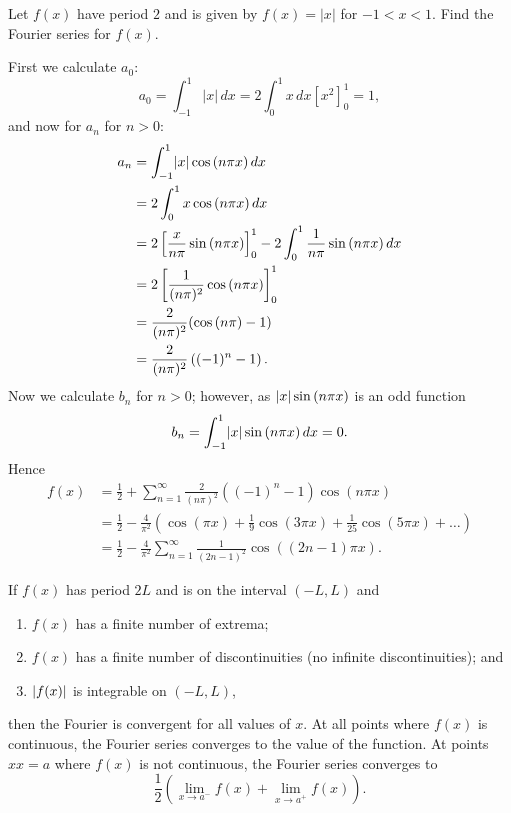 \begin{example}
    Let \(f(x)\) have period $2$ and is given by $f(x) = |x|$ for $-1 < x < 1$. Find the Fourier series for $f(x)$.
    
    First we calculate $a_0$: \[ a_0 = \int^{1}_{-1} |x| \, dx = 2 \int^{1}_{0} x \, dx \left[x^2\right]^{1}_{0} = 1, \] and now for $a_n$ for $n > 0$:
    \begin{align*}
        a_n &= \int^{1}_{-1} \lvert x\rvert \cos{(n \pi x)} \, dx \\
        &= 2 \int^{1}_{0} x \cos{(n \pi x)} \, dx \\
        &= 2 \left[\frac{x}{n \pi} \sin{(n \pi x)}\right]^{1}_{0} - 2 \int^{1}_{0} \frac{1}{n \pi} \sin{(n \pi x)} \, dx \\
        &= 2 \left[ \frac{1}{(n \pi)^2} \cos{(n \pi x)} \right]^{1}_{0} \\
        &= \frac{2}{(n \pi)^2} (\cos{(n \pi)} - 1) \\
        &= \frac{2}{(n \pi)^2} \left((-1)^n - 1\right).
    \end{align*}
    Now we calculate \(b_n\) for \(n > 0\); however, as \(\lvert x\rvert\sin{(n \pi x)}\) is an odd function \[b_n = \int^{1}_{-1} \lvert x\rvert \sin{(n \pi x)} \, dx = 0.\]
    Hence 
    \begin{align*}
        f(x) &= \frac{1}{2} + \sum_{n = 1}^{\infty} \frac{2}{(n \pi)^2} \left((-1)^n - 1\right) \cos{(n \pi x)} \\
        &= \frac{1}{2} - \frac{4}{\pi^2} \left(\cos{(\pi x)} + \frac{1}{9} \cos{(3 \pi x)} + \frac{1}{25} \cos{(5 \pi x)} + \ldots\right) \\
        &= \frac{1}{2} - \frac{4}{\pi^2} \sum_{n = 1}^{\infty} \frac{1}{(2n - 1)^2}\cos{((2n - 1)\pi x)}.
    \end{align*}
\end{example}

\begin{theorem}
    If $f(x)$ has period $2L$ and is on the interval $(-L, L)$ and
    \begin{enumerate}
        \item $f(x)$ has a finite number of extrema;
        \item $f(x)$ has a finite number of discontinuities (no infinite discontinuities); and
        \item $\lvert f(x)\rvert$ is integrable on $(-L, L)$,
    \end{enumerate}
    then the Fourier is convergent for all values of $x$. At all points where $f(x)$ is continuous, the Fourier series converges to the value of the function. At points $xx = a$ where $f(x)$ is not continuous, the Fourier series converges to \[\frac{1}{2}\left(\lim_{x \to a^{-}}{f(x)} + \lim_{x \to a^{+}}{f(x)}\right).\]
\end{theorem}

